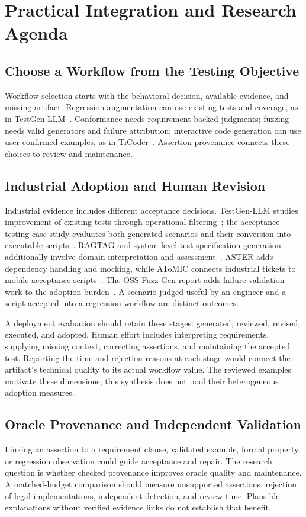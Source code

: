 \section{Practical Integration and Research Agenda}
\label{sec:agenda}
\subsection{Choose a Workflow from the Testing Objective}
Workflow selection starts with the behavioral decision, available evidence, and missing artifact. Regression augmentation can use existing tests and coverage, as in TestGen-LLM~\cite{U07}. Conformance needs requirement-backed judgments; fuzzing needs valid generators and failure attribution; interactive code generation can use user-confirmed examples, as in TiCoder~\cite{T11}. Assertion provenance connects these choices to review and maintenance.

\subsection{Industrial Adoption and Human Revision}
Industrial evidence includes different acceptance decisions. TestGen-LLM studies improvement of existing tests through operational filtering~\cite{U07}; the acceptance-testing case study evaluates both generated scenarios and their conversion into executable scripts~\cite{R03}. RAGTAG and system-level test-specification generation additionally involve domain interpretation and assessment~\cite{R01,R02}. ASTER adds dependency handling and mocking, while AToMIC connects industrial tickets to mobile acceptance scripts~\cite{U12,R06}. The OSS-Fuzz-Gen report adds failure-validation work to the adoption burden~\cite{F09}. A scenario judged useful by an engineer and a script accepted into a regression workflow are distinct outcomes.

A deployment evaluation should retain these stages: generated, reviewed, revised, executed, and adopted. Human effort includes interpreting requirements, supplying missing context, correcting assertions, and maintaining the accepted test. Reporting the time and rejection reasons at each stage would connect the artifact's technical quality to its actual workflow value. The reviewed examples motivate these dimensions; this synthesis does not pool their heterogeneous adoption measures.

\subsection{Oracle Provenance and Independent Validation}
Linking an assertion to a requirement clause, validated example, formal property, or regression observation could guide acceptance and repair. The research question is whether checked provenance improves oracle quality and maintenance. A matched-budget comparison should measure unsupported assertions, rejection of legal implementations, independent detection, and review time. Plausible explanations without verified evidence links do not establish that benefit.

